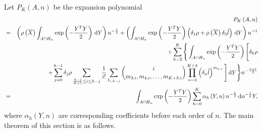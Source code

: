 \begin{comment}
the formula is wrong, need a new one. 
\end{comment}
Let $P_{K}\left(A,n\right)$ be the expansion polynomial 
\begin{eqnarray*}
 &  & P_{K}\left(A,n\right)\\
 & = & \left(\rho\left(\overline{X}\right)\int_{A\cap H_{n}}\exp\left(-\frac{Y^{T}Y}{2}\right)\,\mathrm{d} Y\right)n^{-\frac{1}{2}}+\left(\int_{A\cap H_{n}}\exp\left(-\frac{Y^{T}Y}{2}\right)\left(\delta_{1}\rho+\rho\left(\overline{X}\right)\delta_{3}\hat{l}\right)\,\mathrm{d} Y\right)n^{-1}\\
 &  & +\sum_{h=2}^{K}\Bigg\{\int_{A\cap H_{n}}\exp\left(-\frac{Y^{T}Y}{2}\right)\Bigg[\delta_{h}\rho\\
 &  & +\sum_{j=0}^{h-1}\delta_{j}\rho\sum_{\frac{h-j}{K+1}\le i\le h-j}\frac{1}{i!}\sum_{I_{i,h-j}}\binom{i}{m_{3,i},m_{4,i},\ldots,m_{K+3,i}}\prod_{u=3}^{K+3}\left(\delta_{u}\hat{l}\right)^{m_{u,i}}\Bigg]\,\mathrm{d} Y\Bigg\} n^{-\frac{h+1}{2}}\\
 & = & \int_{A\cap H_{n}}\exp\left(-\frac{Y^{T}Y}{2}\right)\sum_{h=0}^{K}\alpha_{h}\left(Y,n\right)n^{-\frac{h}{2}}\,\mathrm{d} n^{-\frac{1}{2}}Y,
\end{eqnarray*}
where $\alpha_{h}\left(Y,n\right)$ are corresponding coefficients
before each order of $n$. %
The main theorem of this section is as follows.
\begin{comment}
add normal case and multivariate case
\end{comment}

